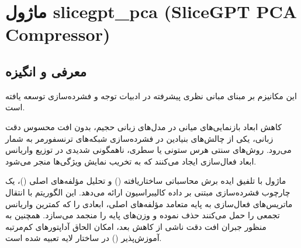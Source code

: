 \section{ماژول slicegpt\_pca (SliceGPT PCA Compressor)}
\label{sec:module_slicegpt_pca}

\subsection{معرفی و انگیزه}
این مکانیزم بر مبنای مبانی نظری پیشرفته در ادبیات توجه و فشرده‌سازی \cite{ashkboos2024slicegpt} توسعه یافته است.

کاهش ابعاد بازنمایی‌های میانی در مدل‌های زبانی حجیم، بدون افت محسوس دقت زبانی، یکی از چالش‌های بنیادین در فشرده‌سازی شبکه‌های ترنسفورمر به شمار می‌رود. روش‌های سنتی هرس ستونی یا سطری، ناهمگونی شدیدی در توزیع واریانس ابعاد فعال‌سازی ایجاد می‌کنند که به تخریب نمایش ویژگی‌ها منجر می‌شود.

ماژول  با تلفیق ایده برش محاسباتی ساختاریافته () و تحلیل مؤلفه‌های اصلی ()، یک چارچوب فشرده‌سازی مبتنی بر داده کالیبراسیون ارائه می‌دهد. این الگوریتم با انتقال ماتریس‌های فعال‌سازی به پایه متعامد مؤلفه‌های اصلی، ابعادی را که کمترین واریانس تجمعی را حمل می‌کنند حذف نموده و وزن‌های پایه را منجمد می‌سازد. همچنین به منظور جبران افت دقت ناشی از کاهش بعد، امکان الحاق آداپتورهای کم‌مرتبه آموزش‌پذیر () در ساختار لایه تعبیه شده است.

